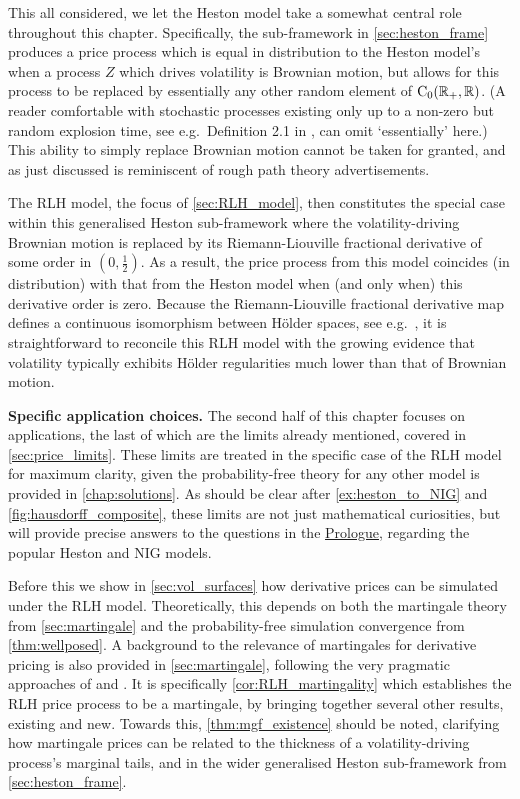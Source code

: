 This all considered, we let the Heston model take a somewhat central role throughout this chapter. Specifically, the sub-framework in \autoref{sec:heston_frame} produces a price process which is equal in distribution to the Heston model's when a process $Z$ which drives volatility is Brownian motion, but allows for this process to be replaced by essentially any other random element of $\mathrm{C}_0(\mathbb{R}_+,\mathbb{R})$. (A reader comfortable with stochastic processes existing only up to a non-zero but random explosion time, see e.g.~Definition 2.1 in \cite{ikeda_1989}, can omit `essentially' here.) This ability to simply replace Brownian motion cannot be taken for granted, and as just discussed is reminiscent of rough path theory advertisements.

The RLH model, the focus of \autoref{sec:RLH_model}, then constitutes the special case within this generalised Heston sub-framework where the volatility-driving Brownian motion is replaced by its Riemann-Liouville fractional derivative of some order in $(0,\frac12)$. As a result, the price process from this model coincides (in distribution) with that from the Heston model when (and only when) this derivative order is zero. Because the Riemann-Liouville fractional derivative map defines a continuous isomorphism between H\"older spaces, see e.g.~\cite{samko_1993}, it is straightforward to reconcile this RLH model with the growing evidence that volatility typically exhibits H\"older regularities much lower than that of Brownian motion.

\vspace{3mm}\textbf{Specific application choices.} The second half of this chapter focuses on applications, the last of which are the limits already mentioned, covered in \autoref{sec:price_limits}. These limits are treated in the specific case of the RLH model for maximum clarity, given the probability-free theory for any other model is provided in \autoref{chap:solutions}. As should be clear after \autoref{ex:heston_to_NIG} and  \autoref{fig:hausdorff_composite}, these limits are not just mathematical curiosities, but will provide precise answers to the questions in the \hyperlink{prologue}{Prologue}, regarding the popular Heston and NIG models.

Before this we show in \autoref{sec:vol_surfaces} how derivative prices can be simulated under the RLH model. Theoretically, this depends on both the martingale theory from \autoref{sec:martingale} and the probability-free simulation convergence from \autoref{thm:wellposed}. A background to the relevance of martingales for derivative pricing is also provided in \autoref{sec:martingale}, following the very pragmatic approaches of \cite{cont_2003} and \cite{guyon_2013}. It is specifically \autoref{cor:RLH_martingality} which establishes the RLH price process to be a martingale, by bringing together several other results, existing and new. Towards this, \autoref{thm:mgf_existence} should be noted, clarifying how martingale prices can be related to the thickness of a volatility-driving process's marginal tails, and in the wider generalised Heston sub-framework from \autoref{sec:heston_frame}.

